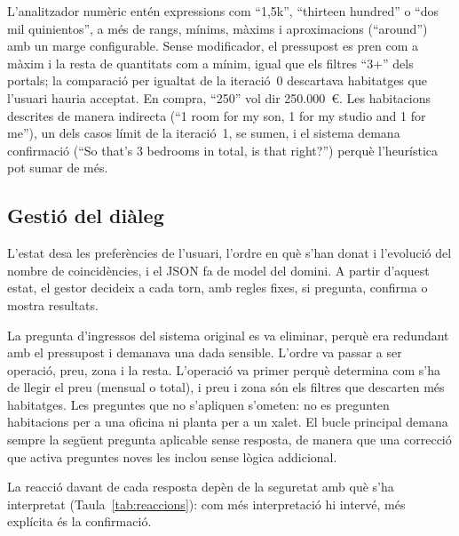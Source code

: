 \documentclass[10pt,a4paper]{article}
\begin{document}
L'analitzador numèric entén expressions com ``1,5k'', ``thirteen hundred'' o ``dos mil quinientos'', a més de rangs, mínims, màxims i aproximacions (``around'') amb un marge configurable. Sense modificador, el pressupost es pren com a màxim i la resta de quantitats com a mínim, igual que els filtres ``3+'' dels portals; la comparació per igualtat de la iteració~0 descartava habitatges que l'usuari hauria acceptat. En compra, ``250'' vol dir 250.000~€. Les habitacions descrites de manera indirecta (``1 room for my son, 1 for my studio and 1 for me''), un dels casos límit de la iteració~1, se sumen, i el sistema demana confirmació (``So that's 3 bedrooms in total, is that right?'') perquè l'heurística pot sumar de més.

\subsection{Gestió del diàleg}

L'estat desa les preferències de l'usuari, l'ordre en què s'han donat i l'evolució del nombre de coincidències, i el JSON fa de model del domini. A partir d'aquest estat, el gestor decideix a cada torn, amb regles fixes, si pregunta, confirma o mostra resultats.

La pregunta d'ingressos del sistema original es va eliminar, perquè era redundant amb el pressupost i demanava una dada sensible. L'ordre va passar a ser operació, preu, zona i la resta. L'operació va primer perquè determina com s'ha de llegir el preu (mensual o total), i preu i zona són els filtres que descarten més habitatges. Les preguntes que no s'apliquen s'ometen: no es pregunten habitacions per a una oficina ni planta per a un xalet. El bucle principal demana sempre la següent pregunta aplicable sense resposta, de manera que una correcció que activa preguntes noves les inclou sense lògica addicional.

La reacció davant de cada resposta depèn de la seguretat amb què s'ha interpretat (Taula~\ref{tab:reaccions}): com més interpretació hi intervé, més explícita és la confirmació.
\end{document}
